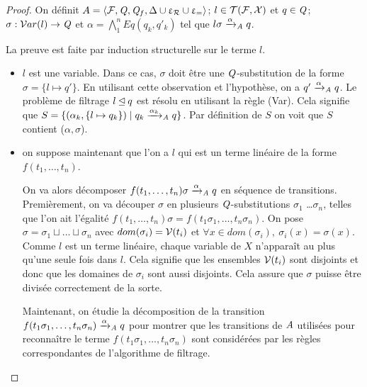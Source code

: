 \begin{proof}

  On définit $A = \langle \mathcal{F}, \mathit Q, \mathit Q_f, \Delta \cup \upvarepsilon_{\mathcal R} \cup \upvarepsilon_{=}\rangle$;
  $l \in \mathcal{T(F, X)}$ et $q \in \mathit Q$; $\sigma : \mathcal{ V}ar(l) \rightarrow \mathit Q$ et $\alpha = \bigwedge_1^n Eq(q_k,q'_k)$ tel que $l\sigma \xrightarrow{\alpha}_\mathit A q$.

  \medskip
  \noindent
  La preuve est faite par induction structurelle sur le terme $l$.

  \medskip
  \noindent
  \begin{itemize}
  \item $l$ est une variable.
    Dans ce cas, $\sigma$ doit être une $\mathit Q$-substitution de la forme $\sigma =\{ l \mapsto q' \}$.
    En utilisant cette observation et l'hypothèse, on a $q' \xrightarrow{\alpha}_\mathit A q$.
    Le problème de filtrage $l \unlhd q$ est résolu en utilisant la règle (Var).
    Cela signifie que $S = \{(\alpha_k, \{l \mapsto q_k\}) \; | \; q_k \xrightarrow{\alpha_k}_\mathit A q\}$.
    Par définition de $S$ on voit que $S$ contient ($\alpha, \sigma$).
    \medskip
  \item
  on suppose maintenant que l'on a $l$ qui est un terme linéaire de la forme $f(t_1,\dots, t_n)$.

  On va alors décomposer $f(t_1,\dots, t_n)\sigma \xrightarrow{\alpha}_\mathit A q$ en séquence de transitions.
  Premièrement, on va découper $\sigma$ en plusieurs $\mathit Q$-substitutions $\sigma_1$ \dots $\sigma_n$, telles que 
  l'on ait l'égalité $f(t_1,\dots, t_n)\sigma = f(t_1\sigma_1, \dots,t_n\sigma_n)$.
  On pose $\sigma = \sigma_1 \sqcup \dots \sqcup \sigma_n$ avec $dom(\sigma_i) = \mathcal V(t_i)$ et
  $\forall x \in dom(\sigma_i),\ \sigma_i(x) = \sigma(x)$.
  Comme $l$ est un terme linéaire, chaque variable de $X$ n'apparaît au plus qu'une seule fois dans $l$.
  Cela signifie que les ensembles $\mathcal V(t_i)$ sont disjoints et donc que les domaines de $\sigma_i$ sont aussi disjoints.
  Cela assure que $\sigma$ puisse être divisée correctement de la sorte.


  Maintenant, on étudie la décomposition de la transition $f(t_1\sigma_1,\dots, t_n\sigma_n) \xrightarrow{\alpha}_\mathit A q$ pour montrer que les transitions de $\mathit A$ utilisées
  pour reconnaître le terme $f(t_1\sigma_1,\dots, t_n\sigma_n)$ sont considérées par les règles correspondantes de l'algorithme de filtrage.


\end{itemize}
\end{proof}
